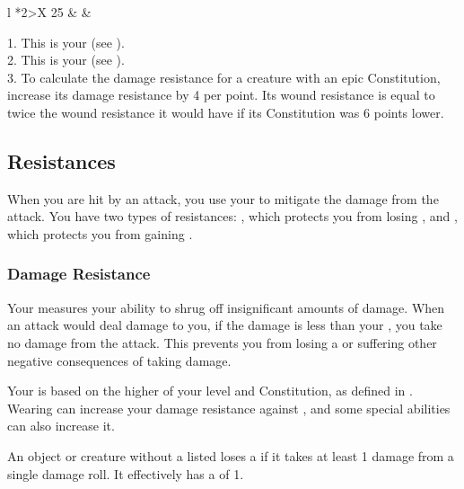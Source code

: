 \begin{dtable}
\begin{dtabularx}{\columnwidth}{l *{2}{>{\ccol}X}}
            25\plus{}       & \tdash            & \tdash \\
        \end{dtabularx}
        1. This is your  (see ). \\
        2. This is your  (see ). \\
        3. To calculate the damage resistance for a creature with an epic Constitution, increase its damage resistance by 4 per point.
        Its wound resistance is equal to twice the wound resistance it would have if its Constitution was 6 points lower.
    \end{dtable}

    \subsection{Resistances}\label{Resistances}
        When you are hit by an attack, you use your  to mitigate the damage from the attack.
        You have two types of resistances: , which protects you from losing , and , which protects you from gaining .

        \subsubsection{Damage Resistance}\label{Damage Resistance}
            Your  measures your ability to shrug off insignificant amounts of damage.
            When an attack would deal damage to you, if the damage is less than your , you take no damage from the attack.
            This prevents you from losing a  or suffering other negative consequences of taking damage.

            Your  is based on the higher of your level and Constitution, as defined in .
            Wearing  can increase your damage resistance against , and some special abilities can also increase it.

             An object or creature without a listed  loses a  if it takes at least 1 damage from a single damage roll.
            It effectively has a  of 1.

